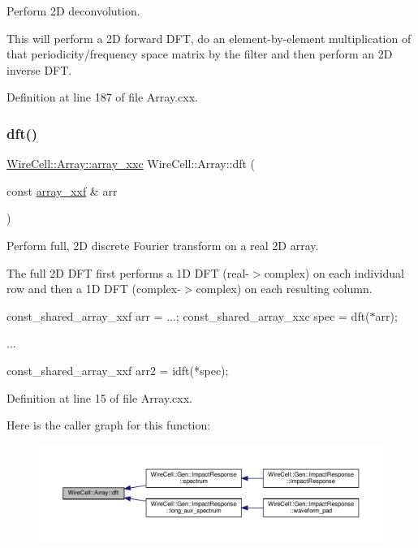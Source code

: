 Perform 2D deconvolution.

This will perform a 2D forward D\+FT, do an element-\/by-\/element multiplication of that periodicity/frequency space matrix by the filter and then perform an 2D inverse D\+FT. 

Definition at line 187 of file Array.\+cxx.

\mbox{\label{namespace_wire_cell_1_1_array_aa6783f65a9e3b61db246eee7352fa6ee}} 
\subsubsection{\texorpdfstring{dft()}{dft()}}
{\footnotesize\ttfamily \hyperlink{namespace_wire_cell_1_1_array_a4688507545975422d74b9ba78530956a}{Wire\+Cell\+::\+Array\+::array\+\_\+xxc} Wire\+Cell\+::\+Array\+::dft (\begin{DoxyParamCaption}\item[{const \hyperlink{namespace_wire_cell_1_1_array_ab565fef5e33632bb02f0ed4be803020c}{array\+\_\+xxf} \&}]{arr }\end{DoxyParamCaption})}

Perform full, 2D discrete Fourier transform on a real 2D array.

The full 2D D\+FT first performs a 1D D\+FT (real-\/$>$complex) on each individual row and then a 1D D\+FT (complex-\/$>$complex) on each resulting column.

const\+\_\+shared\+\_\+array\+\_\+xxf arr = ...; const\+\_\+shared\+\_\+array\+\_\+xxc spec = dft($\ast$arr);

... \begin{DoxyVerb}    const_shared_array_xxf arr2 = idft(*spec);\end{DoxyVerb}
 

Definition at line 15 of file Array.\+cxx.

Here is the caller graph for this function\+:
\nopagebreak
\begin{figure}[H]
\begin{center}
\leavevmode
\includegraphics[width=350pt]{namespace_wire_cell_1_1_array_aa6783f65a9e3b61db246eee7352fa6ee_icgraph}
\end{center}
\end{figure}
\mbox{\label{namespace_wire_cell_1_1_array_a312b7bcf55424009be17c8fd731e85f1}} 
